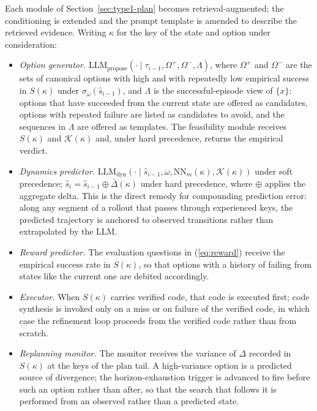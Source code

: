 \documentclass[11pt]{article}
\newcommand{\llm}[1]{\mathrm{LLM}_{\mathrm{#1}}}
\newcommand{\calK}{\mathcal{K}}
\newcommand{\shat}{\hat{s}}
\begin{document}
Each module of Section~\ref{sec:type1-plan} becomes retrieval-augmented; the conditioning is extended and the prompt template is amended to describe the retrieved evidence. Writing $\kappa$ for the key of the state and option under consideration:
\begin{itemize}[leftmargin=1.5em,itemsep=1pt]
\item \emph{Option generator.} $\llm{propose}(\cdot\mid\tau_{i-1},\Omega^{+},\Omega^{-},\Lambda)$, where $\Omega^{+}$ and $\Omega^{-}$ are the sets of canonical options with high and with repeatedly low empirical success in $S(\kappa)$ under $\sigma_{\bar\omega}(\shat_{i-1})$, and $\Lambda$ is the successful-episode view of $\{x\}$: options that have succeeded from the current state are offered as candidates, options with repeated failure are listed as candidates to avoid, and the sequences in $\Lambda$ are offered as templates. The feasibility module receives $S(\kappa)$ and $\calK(\kappa)$ and, under hard precedence, returns the empirical verdict.
\item \emph{Dynamics predictor.} $\llm{dyn}(\cdot\mid\shat_{i-1},\omega,\mathrm{NN}_m(\kappa),\calK(\kappa))$ under soft precedence; $\shat_i=\shat_{i-1}\oplus\bar\Delta(\kappa)$ under hard precedence, where $\oplus$ applies the aggregate delta. This is the direct remedy for compounding prediction error: along any segment of a rollout that passes through experienced keys, the predicted trajectory is anchored to observed transitions rather than extrapolated by the LLM.
\item \emph{Reward predictor.} The evaluation questions in (\ref{eq:reward}) receive the empirical success rate in $S(\kappa)$, so that options with a history of failing from states like the current one are debited accordingly.
\item \emph{Executor.} When $S(\kappa)$ carries verified code, that code is executed first; code synthesis is invoked only on a miss or on failure of the verified code, in which case the refinement loop proceeds from the verified code rather than from scratch.
\item \emph{Replanning monitor.} The monitor receives the variance of $\Delta$ recorded in $S(\kappa)$ at the keys of the plan tail. A high-variance option is a predicted source of divergence; the horizon-exhaustion trigger is advanced to fire before such an option rather than after, so that the search that follows it is performed from an observed rather than a predicted state.
\end{itemize}
\end{document}

